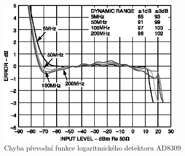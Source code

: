\begin{figure}[htbp]\includegraphics[width=0.8\textwidth,keepaspectratio]{images/AD8309_error.eps}\caption{Chyba převodní funkce logaritmického detektoru AD8309 \cite{AD8309datasheet}}\label{ad8309error}\end{figure}
